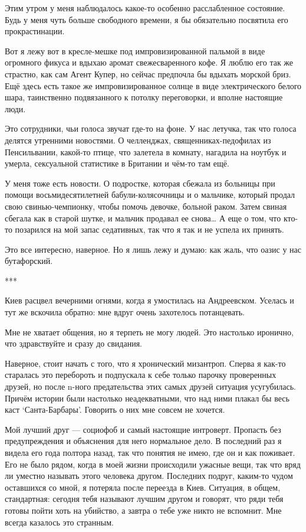 \documentclass[
]{book}
\begin{document}
Этим утром у меня наблюдалось какое-то особенно расслабленное состояние. Будь у меня чуть больше свободного времени, я бы обязательно посвятила его прокрастинации.

Вот я лежу вот в кресле-мешке под импровизированной пальмой в виде огромного фикуса и вдыхаю аромат свежесваренного кофе. Я люблю его так же страстно, как сам Агент Купер, но сейчас предпочла бы вдыхать морской бриз. Ещё здесь есть такое же импровизированное солнце в виде электрического белого шара, таинственно подвязанного к потолку переговорки, и вполне настоящие люди.

Это сотрудники, чьи голоса звучат где-то на фоне. У нас летучка, так что голоса делятся утренними новостями. О челленджах, священниках-педофилах из Пенсильвании, какой-то птице, что залетела в комнату, нагадила на ноутбук и умерла, сексуальной статистике в Британии и чём-то там ещё.

У меня тоже есть новости. О подростке, которая сбежала из больницы при помощи восьмидесятилетней бабули-колясочницы и о мальчике, который продал свою свинью-чемпионку, чтобы помочь девочке, больной раком. Затем свиная сбегала как в старой шутке, и мальчик продавал ее снова\ldots{} А еще о том, что кто-то позарился на мой запас седативных, так что я так и не успела их принять.

Это все интересно, наверное. Но я лишь лежу и думаю: как жаль, что оазис у нас бутафорский.

***

Киев расцвел вечерними огнями, когда я умостилась на Андреевском. Уселась и тут же вскочила обратно: мне вдруг очень захотелось потанцевать.

Мне не хватает общения, но я терпеть не могу людей. Это настолько иронично, что здравствуйте и сразу до свидания.

Наверное, стоит начать с того, что я хронический мизантроп. Сперва я как-то старалась это перебороть и подпускала к себе только парочку проверенных друзей, но после n-ного предательства этих самых друзей ситуация усугубилась. Причём истории были настолько неадекватными, что над ними плакал бы весь каст `Санта-Барбары'. Говорить о них мне совсем не хочется.

Мой лучший друг --- социофоб и самый настоящие интроверт. Пропасть без предупреждения и объяснения для него нормальное дело. В последний раз я видела его года полтора назад, так что понятия не имею, где он и как поживает. Его не было рядом, когда в моей жизни происходили ужасные вещи, так что вряд ли уместно называть этого человека другом. Последних подруг, каким-то чудом оставшихся со мной, я потеряла после переезда в Киев. Ситуация, в общем, стандартная: сегодня тебя называют лучшим другом и говорят, что ряди тебя готовы пойти хоть на убийство, а завтра о тебе уже никто не вспомнит. Мне всегда казалось это странным.
\end{document}
